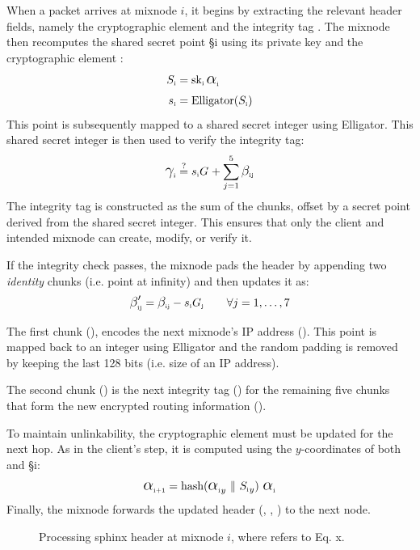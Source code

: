 When a packet arrives at mixnode $i$, it begins by extracting the relevant header fields, namely the cryptographic element  and the integrity tag .  
The mixnode then recomputes the shared secret point \S{i} using its private key  and the cryptographic element :  
\begin{equation}
\begin{aligned}
    \S{i} &= \sk{i} \, \A{i} \\
    \s{i} &= \text{Elligator}(\S{i})\\
\end{aligned}
\label{eq:derive_secret}
\end{equation}
This point is subsequently mapped to a shared secret integer  using Elligator.
This shared secret integer is then used to verify the integrity tag: 
\begin{equation}
\C{i} \overset{\text{?}}{=} \sG{i}{} + \sum_{j=1}^{5} \B{i}{j}
\label{eq:integrity_check}
\end{equation}
The integrity tag is constructed as the sum of the chunks, offset by a secret point derived from the shared secret integer. 
This ensures that only the client and intended mixnode can create, modify, or verify it.

\noindent If the integrity check passes, the mixnode pads the header by appending two \textit{identity} chunks (i.e. point at infinity) and then updates it as:
\begin{equation}
{\BB{i}{j}} = \B{i}{j} - \sG{i}{j} \qquad \forall j = 1, \dots, 7
\label{eq:decrypt}
\end{equation}

The first chunk ({}), encodes the next mixnode’s IP address (). 
This point is mapped back to an integer using Elligator and the random padding is removed by keeping the last 128 bits (i.e. size of an IP address).

\noindent The second chunk ({}) is the next integrity tag () for the remaining five chunks that form the new encrypted routing information ().

To maintain unlinkability, the cryptographic element  must be updated for the next hop. 
As in the client's step, it is computed using the $y$-coordinates of both  and \S{i}:
\begin{equation}
\A{i+1} = \text{hash}({\A{i}}_y \ \| \ {\S{i}}_y) \ \A{i}
\label{eq:update_alpha}
\end{equation}
Finally, the mixnode forwards the updated header (, , ) to the next node.

\begin{figure}[H]
    \centering
    \resizebox{0.9\linewidth}{!}{}
    \caption{Processing sphinx header at mixnode $i$, where \eq[x] refers to Eq. x.}
    \label{fig:mixnode_decryption}
\end{figure}


